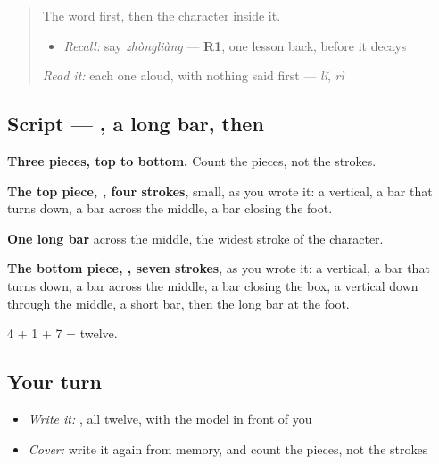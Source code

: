 \label{lesson:ZH-W526-liang-amount}



\begin{quote}
The word first, then the character inside it.

\begin{itemize}
\raggedright
  \item \emph{Recall:} say \emph{zhòngliàng} — \textbf{R1}, one lesson back, before it decays
\end{itemize}

\begin{quote}
 
\end{quote}

\emph{Read it:} each one aloud, with nothing said first — \emph{lǐ}, \emph{rì}
\end{quote}

\subsection*{Script — , a long bar, then }

\begin{quote}
\end{quote}

\textbf{Three pieces, top to bottom.} Count the pieces, not the strokes.

\textbf{The top piece, , four strokes}, small, as you wrote it: a vertical, a bar that turns down, a bar across the middle, a bar closing the foot.

\textbf{One long bar} across the middle, the widest stroke of the character.

\textbf{The bottom piece, , seven strokes}, as you wrote it: a vertical, a bar that turns down, a bar across the middle, a bar closing the box, a vertical down through the middle, a short bar, then the long bar at the foot.

4 + 1 + 7 = twelve.

\subsection*{Your turn}
\begin{itemize}
\raggedright
  \item \emph{Write it:} , all twelve, with the model in front of you
  \item \emph{Cover:} write it again from memory, and count the pieces, not the strokes
\end{itemize}

